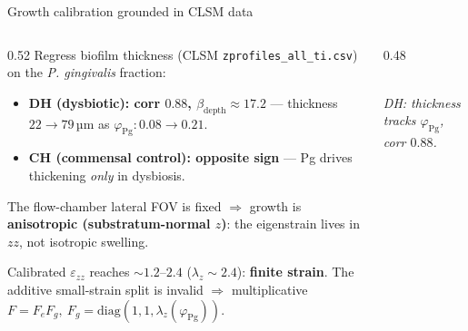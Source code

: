 \documentclass[aspectratio=169,xcolor=dvipsnames]{beamer}
\begin{document}
\begin{frame}{Growth calibration grounded in CLSM data}
\begin{columns}[T]
\begin{column}{0.52\textwidth}
\small
Regress biofilm thickness (CLSM \texttt{zprofiles\_all\_ti.csv}) on the \textit{P. gingivalis} fraction:
\begin{itemize}
  \item \textbf{DH (dysbiotic): corr $0.88$, $\beta_{\text{depth}}\approx 17.2$} — thickness
        $22\to79$\,µm as $\varphi_{\text{Pg}}\!: 0.08\to0.21$.
  \item \textbf{CH (commensal control): opposite sign} — Pg drives thickening \emph{only} in dysbiosis.
\end{itemize}
\vspace{0.3em}
The flow-chamber lateral FOV is fixed $\Rightarrow$ growth is \textbf{anisotropic
(substratum-normal $z$)}: the eigenstrain lives in $zz$, not isotropic swelling.
\vspace{0.4em}

Calibrated $\varepsilon_{zz}$ reaches $\sim 1.2$--$2.4$ ($\lambda_z\!\sim\!2.4$): \textbf{finite strain}.
The additive small-strain split is invalid $\Rightarrow$ multiplicative
$F = F_e F_g,\ F_g=\mathrm{diag}(1,1,\lambda_z(\varphi_{\text{Pg}}))$.
\end{column}
\begin{column}{0.48\textwidth}
\centering
{}
\\[-0.2em]
\footnotesize\textit{DH: thickness tracks $\varphi_{\text{Pg}}$, corr $0.88$.}
\end{column}
\end{columns}
\end{frame}
\end{document}
